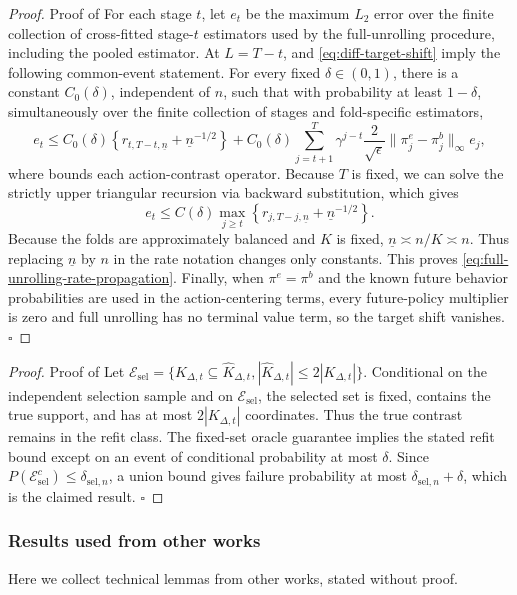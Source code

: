 \documentclass[opre,nonblindrev]{informs4}
\newcommand{\norm}[1]{\lVert#1\rVert}
\renewcommand{\qed}{\unskip\nobreak\hfill\ensuremath{\square}}
\begin{document}
\begin{proof}{Proof of }
For each stage $t$, let $e_t$ be the maximum $L_2$ error over the finite
collection of cross-fitted stage-$t$ estimators used by the full-unrolling
procedure, including the pooled estimator.
At $L=T-t$,  and
\cref{eq:diff-target-shift} imply the following common-event statement. For
every fixed $\delta\in(0,1)$, there is a constant $C_0(\delta)$, independent of $n$,
such that with probability at least $1-\delta$, simultaneously over the finite
collection of stages and fold-specific estimators,
\[
e_t\leq C_0(\delta)
\left\{
r_{t,T-t,\underline n}+\underline n^{-1/2}
\right\}
+C_0(\delta)\sum_{j=t+1}^T\gamma^{j-t}
\frac{2}{\sqrt\epsilon}
\norm{\pi_j^e-\pi_j^b}_\infty e_j,
\]
where  bounds each action-contrast
operator.
Because $T$ is fixed, we can solve the strictly upper triangular recursion via backward substitution, which gives
\[
e_t\leq C(\delta)
\max_{j\geq t}\left\{r_{j,T-j,\underline n}+\underline n^{-1/2}\right\}.
\]
Because the folds are approximately balanced and $K$ is fixed,
$\underline n\asymp n/K\asymp n$. Thus replacing $\underline n$ by $n$
in the rate notation changes only constants.
This proves \cref{eq:full-unrolling-rate-propagation}. Finally, when
$\pi^e=\pi^b$ and the known
future behavior probabilities are used in the action-centering terms, every
future-policy multiplier is zero and full unrolling has no terminal value
term, so the target shift vanishes. \qed
\end{proof}

\begin{proof}{Proof of }
Let $\mathcal E_{\mathrm{sel}}
=\{K_{\Delta,t}\subseteq\hat K_{\Delta,t},
|\hat K_{\Delta,t}|\le 2|K_{\Delta,t}|\}$. Conditional on the
independent selection sample and on $\mathcal E_{\mathrm{sel}}$, the selected
set is fixed, contains the true support, and has at most
$2|K_{\Delta,t}|$ coordinates. Thus the true contrast remains in
the refit class. The fixed-set oracle guarantee implies the stated refit
bound except on an event of
conditional probability at most $\delta$. Since
$P(\mathcal E_{\mathrm{sel}}^c)\leq\delta_{\mathrm{sel},n}$, a union bound
gives failure probability at most $\delta_{\mathrm{sel},n}+\delta$, which is
the claimed result. \qed
\end{proof}

\subsubsection{Results used from other works}
Here we collect technical lemmas from other works, stated without proof. 
\end{document}
